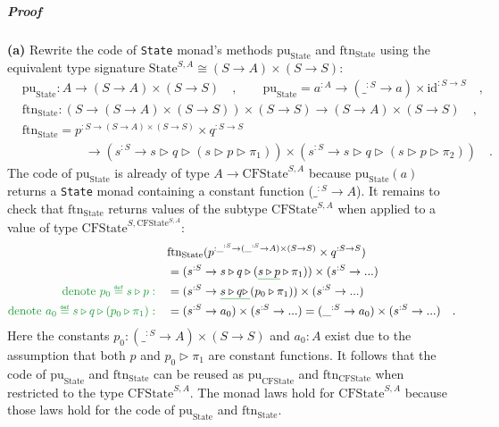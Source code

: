 \subparagraph{Proof}

\textbf{(a)} Rewrite the code of \lstinline!State! monad\textsf{'}s methods
$\text{pu}_{\text{State}}$ and $\text{ftn}_{\text{State}}$ using
the equivalent type signature $\text{State}^{S,A}\cong(S\rightarrow A)\times(S\rightarrow S)$:
\begin{align*}
 & \text{pu}_{\text{State}}:A\rightarrow(S\rightarrow A)\times(S\rightarrow S)\quad,\quad\quad\text{pu}_{\text{State}}=a^{:A}\rightarrow(\_^{:S}\rightarrow a)\times\text{id}^{:S\rightarrow S}\quad,\\
 & \text{ftn}_{\text{State}}:(S\rightarrow(S\rightarrow A)\times(S\rightarrow S))\times(S\rightarrow S)\rightarrow(S\rightarrow A)\times(S\rightarrow S)\quad,\\
 & \text{ftn}_{\text{State}}=p^{:S\rightarrow(S\rightarrow A)\times(S\rightarrow S)}\times q^{:S\rightarrow S}\\
 & \quad\quad\quad\quad\quad\rightarrow(s^{:S}\rightarrow s\triangleright q\triangleright(s\triangleright p\triangleright\pi_{1}))\times(s^{:S}\rightarrow s\triangleright q\triangleright(s\triangleright p\triangleright\pi_{2}))\quad.
\end{align*}
The code of $\text{pu}_{\text{State}}$ is already of type $A\rightarrow\text{CFState}^{S,A}$
because $\text{pu}_{\text{State}}(a)$ returns a \lstinline!State!
monad containing a constant function ($\_^{:S}\rightarrow A$). It
remains to check that $\text{ftn}_{\text{State}}$ returns values
of the subtype $\text{CFState}^{S,A}$ when applied to a value of
type $\text{CFState}^{S,\text{CFState}^{S,A}}$:
\begin{align*}
 & \text{ftn}_{\text{State}}(p^{:\_^{:S}\rightarrow(\_^{:S}\rightarrow A)\times(S\rightarrow S)}\times q^{:S\rightarrow S})\\
 & =(s^{:S}\rightarrow s\triangleright q\triangleright(\gunderline{s\triangleright p}\triangleright\pi_{1}))\times(s^{:S}\rightarrow...)\\
{\color{greenunder}\text{denote }p_{0}\triangleq s\triangleright p:}\quad & =(s^{:S}\rightarrow\gunderline{s\triangleright q\triangleright\,}(p_{0}\triangleright\pi_{1}))\times(s^{:S}\rightarrow...)\\
{\color{greenunder}\text{denote }a_{0}\triangleq s\triangleright q\triangleright(p_{0}\triangleright\pi_{1}):}\quad & =(s^{:S}\rightarrow a_{0})\times(s^{:S}\rightarrow...)=(\_^{:S}\rightarrow a_{0})\times(s^{:S}\rightarrow...)\quad.
\end{align*}
Here the constants $p_{0}:(\_^{:S}\rightarrow A)\times(S\rightarrow S)$
and $a_{0}:A$ exist due to the assumption that both $p$ and $p_{0}\triangleright\pi_{1}$
are constant functions. It follows that the code of $\text{pu}_{\text{State}}$
and $\text{ftn}_{\text{State}}$ can be reused as $\text{pu}_{\text{CFState}}$
and $\text{ftn}_{\text{CFState}}$ when restricted to the type $\text{CFState}^{S,A}$.
The monad laws hold for $\text{CFState}^{S,A}$ because those laws
hold for the code of $\text{pu}_{\text{State}}$ and $\text{ftn}_{\text{State}}$.

